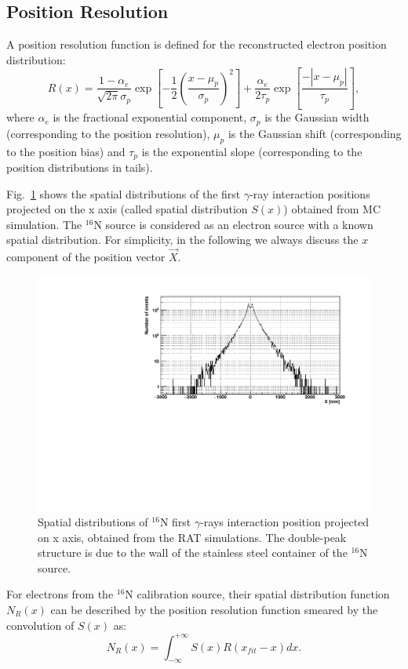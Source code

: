 \subsection{Position Resolution}
A position resolution function is defined for the reconstructed electron position distribution\cite{boulay2004direct}:
\[
R(x)=\frac{1-\alpha_e}{\sqrt{2\pi}\sigma_p}\exp{[-\frac{1}{2}(\frac{x-\mu_p}{\sigma_p})^2]+\frac{\alpha_e}{2\tau_p}\exp{[\frac{-|x-\mu_p|}{\tau_p}]}},
\]
where $\alpha_e$ is the fractional exponential component, $\sigma_p$ is
the Gaussian width (corresponding to the position resolution), $\mu_p$ is the Gaussian shift (corresponding to the position bias) and $\tau_p$ is the exponential slope (corresponding to the position distributions in tails).

Fig.~\ref{hsx} shows the spatial distributions of the first $\gamma$-ray interaction positions projected on the x axis (called spatial distribution $S(x)$) obtained from MC simulation. The $^{16}$N source is considered as an electron source with a known spatial distribution\cite{boulay2004direct}. For simplicity, in the following we always discuss the $x$ component of the position vector $\vec{X}$. 

\begin{figure}[!htb]
	\centering
	\includegraphics[width=12cm]{sx.pdf}
	\caption{Spatial distributions of {$^{16}$}N first $\gamma$-rays interaction position projected on x axis, obtained from the RAT simulations. The double-peak structure is due to the wall of the stainless steel container of the $^{16}$N source.}
	\label{hsx}
\end{figure}



For electrons from the $^{16}$N calibration source, their spatial distribution function $N_{R}(x)$ can be described by the position resolution function smeared by the convolution of $S(x)$ as\cite{boulay2004direct}:
\[
N_{R}(x)=\int^{+\infty}_{-\infty} S(x)R(x_{fit}-x)dx.
\]

